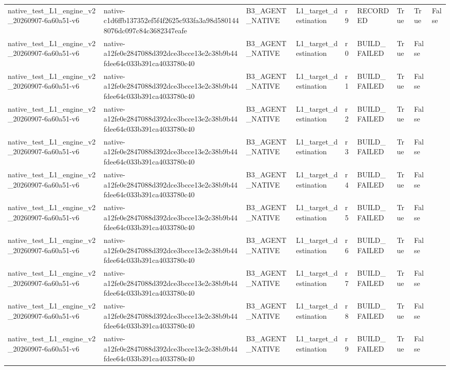 \begin{tabular}{lllllllll}
native\_test\_L1\_engine\_v2\_20260907-6a60a51-v6 & native-c1d6ffb137352ef5f4f2625c933fa3a98d5801448076dc097c84c3682347eafe & B3\_AGENT\_NATIVE & L1\_target\_destination & r9 & RECORDED & True & True & False \\
native\_test\_L1\_engine\_v2\_20260907-6a60a51-v6 & native-a12fe0e2847088d392dce3bcce13e2c38b9b44fdee64c033b391ca4033780c40 & B3\_AGENT\_NATIVE & L1\_target\_destination & r0 & BUILD\_FAILED & True & False &  \\
native\_test\_L1\_engine\_v2\_20260907-6a60a51-v6 & native-a12fe0e2847088d392dce3bcce13e2c38b9b44fdee64c033b391ca4033780c40 & B3\_AGENT\_NATIVE & L1\_target\_destination & r1 & BUILD\_FAILED & True & False &  \\
native\_test\_L1\_engine\_v2\_20260907-6a60a51-v6 & native-a12fe0e2847088d392dce3bcce13e2c38b9b44fdee64c033b391ca4033780c40 & B3\_AGENT\_NATIVE & L1\_target\_destination & r2 & BUILD\_FAILED & True & False &  \\
native\_test\_L1\_engine\_v2\_20260907-6a60a51-v6 & native-a12fe0e2847088d392dce3bcce13e2c38b9b44fdee64c033b391ca4033780c40 & B3\_AGENT\_NATIVE & L1\_target\_destination & r3 & BUILD\_FAILED & True & False &  \\
native\_test\_L1\_engine\_v2\_20260907-6a60a51-v6 & native-a12fe0e2847088d392dce3bcce13e2c38b9b44fdee64c033b391ca4033780c40 & B3\_AGENT\_NATIVE & L1\_target\_destination & r4 & BUILD\_FAILED & True & False &  \\
native\_test\_L1\_engine\_v2\_20260907-6a60a51-v6 & native-a12fe0e2847088d392dce3bcce13e2c38b9b44fdee64c033b391ca4033780c40 & B3\_AGENT\_NATIVE & L1\_target\_destination & r5 & BUILD\_FAILED & True & False &  \\
native\_test\_L1\_engine\_v2\_20260907-6a60a51-v6 & native-a12fe0e2847088d392dce3bcce13e2c38b9b44fdee64c033b391ca4033780c40 & B3\_AGENT\_NATIVE & L1\_target\_destination & r6 & BUILD\_FAILED & True & False &  \\
native\_test\_L1\_engine\_v2\_20260907-6a60a51-v6 & native-a12fe0e2847088d392dce3bcce13e2c38b9b44fdee64c033b391ca4033780c40 & B3\_AGENT\_NATIVE & L1\_target\_destination & r7 & BUILD\_FAILED & True & False &  \\
native\_test\_L1\_engine\_v2\_20260907-6a60a51-v6 & native-a12fe0e2847088d392dce3bcce13e2c38b9b44fdee64c033b391ca4033780c40 & B3\_AGENT\_NATIVE & L1\_target\_destination & r8 & BUILD\_FAILED & True & False &  \\
native\_test\_L1\_engine\_v2\_20260907-6a60a51-v6 & native-a12fe0e2847088d392dce3bcce13e2c38b9b44fdee64c033b391ca4033780c40 & B3\_AGENT\_NATIVE & L1\_target\_destination & r9 & BUILD\_FAILED & True & False &  \\

\end{tabular}
